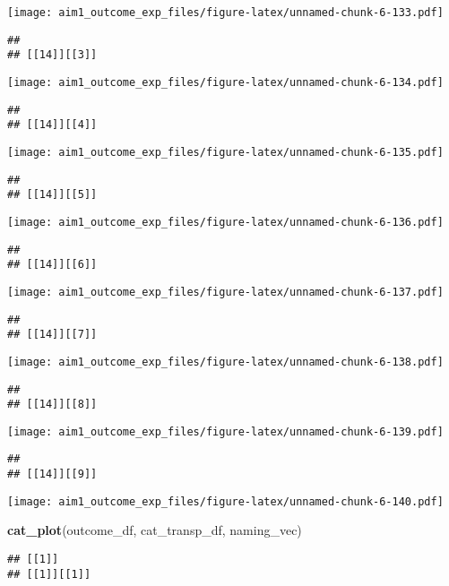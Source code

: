 \documentclass[
]{article}
\newenvironment{Shaded}{\begin{snugshade}}{\end{snugshade}}
\newcommand{\FunctionTok}[1]{\textcolor[rgb]{0.13,0.29,0.53}{\textbf{#1}}}
\newcommand{\NormalTok}[1]{#1}
\begin{document}
\texttt{[image: aim1\_outcome\_exp\_files/figure-latex/unnamed-chunk-6-133.pdf]}

\begin{verbatim}
## 
## [[14]][[3]]
\end{verbatim}

\texttt{[image: aim1\_outcome\_exp\_files/figure-latex/unnamed-chunk-6-134.pdf]}

\begin{verbatim}
## 
## [[14]][[4]]
\end{verbatim}

\texttt{[image: aim1\_outcome\_exp\_files/figure-latex/unnamed-chunk-6-135.pdf]}

\begin{verbatim}
## 
## [[14]][[5]]
\end{verbatim}

\texttt{[image: aim1\_outcome\_exp\_files/figure-latex/unnamed-chunk-6-136.pdf]}

\begin{verbatim}
## 
## [[14]][[6]]
\end{verbatim}

\texttt{[image: aim1\_outcome\_exp\_files/figure-latex/unnamed-chunk-6-137.pdf]}

\begin{verbatim}
## 
## [[14]][[7]]
\end{verbatim}

\texttt{[image: aim1\_outcome\_exp\_files/figure-latex/unnamed-chunk-6-138.pdf]}

\begin{verbatim}
## 
## [[14]][[8]]
\end{verbatim}

\texttt{[image: aim1\_outcome\_exp\_files/figure-latex/unnamed-chunk-6-139.pdf]}

\begin{verbatim}
## 
## [[14]][[9]]
\end{verbatim}

\texttt{[image: aim1\_outcome\_exp\_files/figure-latex/unnamed-chunk-6-140.pdf]}

\begin{Shaded}
\begin{Highlighting}[]
\FunctionTok{cat\_plot}\NormalTok{(outcome\_df, cat\_transp\_df, naming\_vec)}
\end{Highlighting}
\end{Shaded}

\begin{verbatim}
## [[1]]
## [[1]][[1]]
\end{verbatim}
\end{document}
